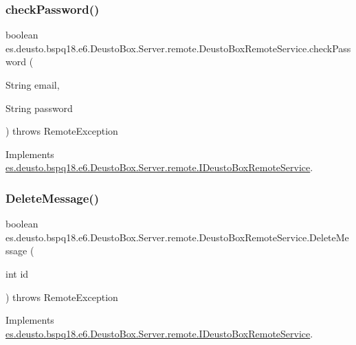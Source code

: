 \subsubsection{\texorpdfstring{check\+Password()}{checkPassword()}}
{\footnotesize\ttfamily boolean es.\+deusto.\+bspq18.\+e6.\+Deusto\+Box.\+Server.\+remote.\+Deusto\+Box\+Remote\+Service.\+check\+Password (\begin{DoxyParamCaption}\item[{String}]{email,  }\item[{String}]{password }\end{DoxyParamCaption}) throws Remote\+Exception}



Implements \mbox{\hyperlink{interfacees_1_1deusto_1_1bspq18_1_1e6_1_1_deusto_box_1_1_server_1_1remote_1_1_i_deusto_box_remote_service_ade1f67d916a6ad0e9d256aa60c80a8a7}{es.\+deusto.\+bspq18.\+e6.\+Deusto\+Box.\+Server.\+remote.\+I\+Deusto\+Box\+Remote\+Service}}.

\mbox{\label{classes_1_1deusto_1_1bspq18_1_1e6_1_1_deusto_box_1_1_server_1_1remote_1_1_deusto_box_remote_service_a1a954b90d573a76975631a924ed1601c}} 
\subsubsection{\texorpdfstring{Delete\+Message()}{DeleteMessage()}}
{\footnotesize\ttfamily boolean es.\+deusto.\+bspq18.\+e6.\+Deusto\+Box.\+Server.\+remote.\+Deusto\+Box\+Remote\+Service.\+Delete\+Message (\begin{DoxyParamCaption}\item[{int}]{id }\end{DoxyParamCaption}) throws Remote\+Exception}



Implements \mbox{\hyperlink{interfacees_1_1deusto_1_1bspq18_1_1e6_1_1_deusto_box_1_1_server_1_1remote_1_1_i_deusto_box_remote_service_a1e33451aff8fea259054145fb9534453}{es.\+deusto.\+bspq18.\+e6.\+Deusto\+Box.\+Server.\+remote.\+I\+Deusto\+Box\+Remote\+Service}}.

